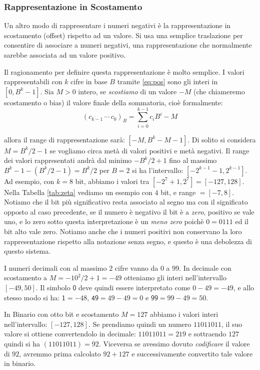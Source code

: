 \subsubsection{Rappresentazione in Scostamento}

Un altro modo di rappresentare i numeri negativi è la rappresentazione in scostamento (offset) rispetto ad un valore. Si usa una semplice traslazione
per consentire di associare a numeri negativi, una rappresentazione che normalmente sarebbe associata ad un valore positivo.

Il ragionamento per definire questa rappresentazione è molto semplice. I valori
rappresentabili con $k$ cifre in base $B$ tramite \eqref{eq:pos} sono gli interi in $[0,B^k-1]$. Sia $M > 0$ intero, se \emph{scostiamo} di un valore $-M$ (che chiameremo scostamento o bias) il valore finale della sommatoria, cioè formalmente:
\[ (c_{k-1}\,\cdots\,c_{0})_B = \sum_{i=0}^{k-1} c_iB^i - M \]

\noindent allora il range di rappresentazione sarà: $[-M,B^k-M-1]$. Di solito
si considera $M = B^k/2-1$ se vogliamo circa metà di valori positivi e metà
negativi. Il range dei valori rappresentati andrà dal minimo $-B^k/2+1$ fino al
massimo $B^k-1-(B^k/2-1) = B^k/2$ per $B=2$ si ha l'intervallo:
$[-2^{k-1}-1,2^{k-1}]$. Ad esempio, con $k = 8$ bit, abbiamo i valori tra
$[-2^7+1,2^7] = [-127,128]$. Nella Tabella \ref{tab:zeta} vediamo un esempio con $4$
bit, e range $= [-7,8]$. Notiamo che il bit più significativo resta associato
al segno ma con il significato opposto al caso precedente, se il numero è
negativo il bit è a \emph{zero}, positivo se vale uno, e lo zero sotto questa
interpretazione è un \emph{meno zero} poichè $0 = 0111$ ed il bit alto vale
zero. Notiamo anche che i numeri positivi non conservano la loro
rappresentazione rispetto alla notazione senza segno, e questo è una debolezza
di questo sistema.


\begin{ex} I numeri decimali con al massimo $2$ cifre vanno da $0$ a $99$. In decimale con scostamento a $M = -10^2/2 + 1 = -49$ otteniamo gli interi nell'intervallo $[-49,50]$. Il simbolo $\mathsf 0$ deve quindi essere interpretato come $0-49 = -49$, e allo stesso modo si ha: $\mathsf{1} = -48$, $\mathsf{49} = 49 - 49 = 0$ e $\mathsf{99} = 99 - 49 = 50$.

In Binario con otto bit e scostamento $M = 127$ abbiamo i valori interi nell'intervallo: $[-127,128]$. Se prendiamo quindi un numero $11011011$, il suo valore si ottiene convertendolo in decimale:
$11011011 = 219$ e sottraendo $127$ quindi si ha $(11011011) = 92$. Viceversa se avessimo dovuto \emph{codificare} il valore di $92$, avremmo prima calcolato $92+127$ e successivamente convertito tale valore in binario.
\end{ex}

